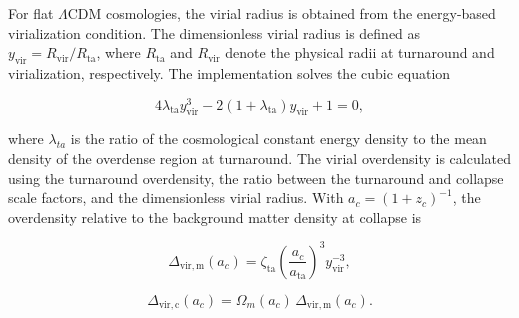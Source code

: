 For flat $\Lambda$CDM cosmologies, the virial radius is obtained from the energy-based virialization condition. The dimensionless virial radius is defined as $y_{\mathrm{vir}}=R_{\mathrm{vir}}/R_{\mathrm{ta}}$, where $R_{\mathrm{ta}}$ and $R_{\mathrm{vir}}$ denote the physical radii at turnaround and virialization, respectively. The implementation solves the cubic equation

\begin{equation}
    4\lambda_{\mathrm{ta}}y_{\mathrm{vir}}^3
    -2(1+\lambda_{\mathrm{ta}})y_{\mathrm{vir}}
    +1=0,
    \label{eq:virial_radius}
\end{equation}

where $\lambda_{ta}$ is the ratio of the cosmological constant energy density to the mean density of the overdense region at turnaround. The virial overdensity is calculated using the turnaround overdensity, the ratio between the turnaround and collapse scale factors, and the dimensionless virial radius. With $a_c=(1+z_c)^{-1}$, the overdensity relative to the background matter density at collapse is

\begin{equation}
    \Delta_{\mathrm{vir,m}}(a_c)
    = \zeta_{\mathrm{ta}}
    \left(\frac{a_c}{a_{\mathrm{ta}}}\right)^3
    y_{\mathrm{vir}}^{-3},
    \label{eq:virial_overdensity_matter}
\end{equation}

\begin{equation}
    \Delta_{\mathrm{vir,c}}(a_c)
    = \Omega_m(a_c)\,
    \Delta_{\mathrm{vir,m}}(a_c).
    \label{eq:virial_overdensity_critical}
\end{equation}

